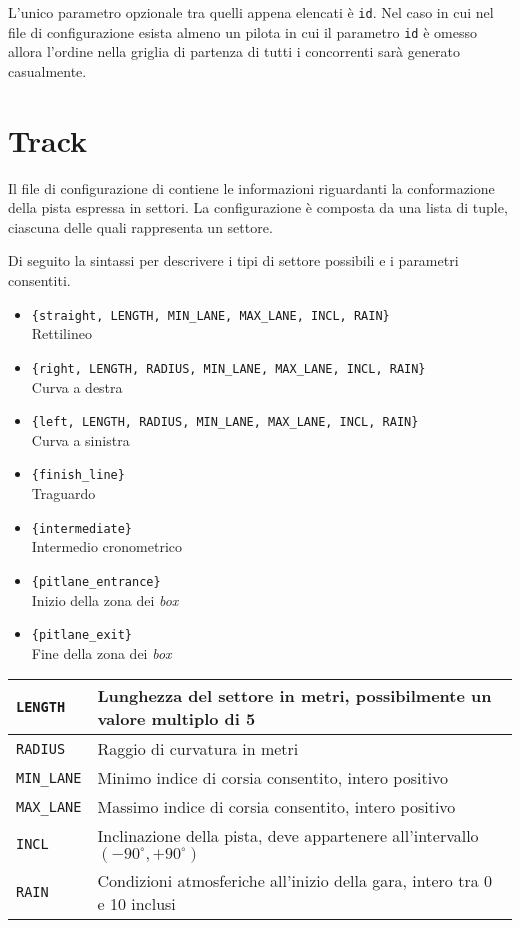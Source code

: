 L'unico parametro opzionale tra quelli appena elencati è \texttt{id}. Nel caso in cui nel file di configurazione esista almeno un pilota in cui il parametro \texttt{id} è omesso allora l'ordine nella griglia di partenza di tutti i concorrenti sarà generato casualmente.

\section*{Track}
Il file di configurazione di \track{} contiene le informazioni riguardanti la conformazione della pista espressa in settori. La configurazione è composta da una lista di tuple, ciascuna delle quali rappresenta un settore.

Di seguito la sintassi per descrivere i tipi di settore possibili e i parametri consentiti.

\begin{itemize}
\item \verb!{straight, LENGTH, MIN_LANE, MAX_LANE, INCL, RAIN}!\\ Rettilineo
\item \verb!{right, LENGTH, RADIUS, MIN_LANE, MAX_LANE, INCL, RAIN}!\\ Curva a destra
\item \verb!{left, LENGTH, RADIUS, MIN_LANE, MAX_LANE, INCL, RAIN}!\\ Curva a sinistra
\item \verb!{finish_line}!\\ Traguardo
\item \verb!{intermediate}!\\ Intermedio cronometrico
\item \verb!{pitlane_entrance}!\\ Inizio della zona dei \textit{box}
\item \verb!{pitlane_exit}!\\ Fine della zona dei \textit{box}
\end{itemize}

\begin{tabularx}{\textwidth}{|l|X|}
\hline
\texttt{LENGTH} & Lunghezza del settore in metri, possibilmente un valore multiplo di 5\\
\hline
\texttt{RADIUS} & Raggio di curvatura in metri\\
\hline
\texttt{MIN\_LANE} & Minimo indice di corsia consentito, intero positivo\\
\hline
\texttt{MAX\_LANE} & Massimo indice di corsia consentito, intero positivo\\
\hline
\texttt{INCL} & Inclinazione della pista, deve appartenere all'intervallo $(-90^\circ, +90^\circ)$\\
\hline
\texttt{RAIN} & Condizioni atmosferiche all'inizio della gara, intero tra 0 e 10 inclusi\\
\hline
\end{tabularx}

